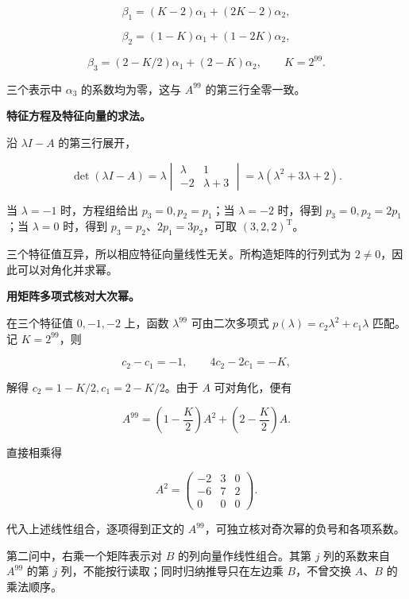 \documentclass[UTF8,11pt,fontset=windows]{ctexart}
\begin{document}
$$
\beta_1=(K-2)\alpha_1+(2K-2)\alpha_2,
$$

$$
\beta_2=(1-K)\alpha_1+(1-2K)\alpha_2,
$$

$$
\beta_3=(2-K/2)\alpha_1+(2-K)\alpha_2,
\qquad K=2^{99}.
$$

三个表示中 $\alpha_3$ 的系数均为零，这与 $A^{99}$ 的第三行全零一致。

\textbf{特征方程及特征向量的求法。}

沿 $\lambda I-A$ 的第三行展开，

$$
\det(\lambda I-A)
=\lambda\begin{vmatrix}\lambda&1\\-2&\lambda+3\end{vmatrix}
=\lambda(\lambda^2+3\lambda+2).
$$

当 $\lambda=-1$ 时，方程组给出 $p_3=0,p_2=p_1$；当 $\lambda=-2$ 时，得到 $p_3=0,p_2=2p_1$；当 $\lambda=0$ 时，得到 $p_3=p_2$、$2p_1=3p_2$，可取 $(3,2,2)^{\mathrm T}$。

三个特征值互异，所以相应特征向量线性无关。所构造矩阵的行列式为 $2\ne0$，因此可以对角化并求幂。

\textbf{用矩阵多项式核对大次幂。}

在三个特征值 $0,-1,-2$ 上，函数 $\lambda^{99}$ 可由二次多项式 $p(\lambda)=c_2\lambda^2+c_1\lambda$ 匹配。记 $K=2^{99}$，则

$$
c_2-c_1=-1,\qquad4c_2-2c_1=-K,
$$

解得 $c_2=1-K/2,c_1=2-K/2$。由于 $A$ 可对角化，便有

$$
A^{99}=\left(1-\frac K2\right)A^2+\left(2-\frac K2\right)A.
$$

直接相乘得

$$
A^2=\begin{pmatrix}-2&3&0\\-6&7&2\\0&0&0\end{pmatrix}.
$$

代入上述线性组合，逐项得到正文的 $A^{99}$，可独立核对奇次幂的负号和各项系数。

第二问中，右乘一个矩阵表示对 $B$ 的列向量作线性组合。其第 $j$ 列的系数来自 $A^{99}$ 的第 $j$ 列，不能按行读取；同时归纳推导只在左边乘 $B$，不曾交换 $A$、$B$ 的乘法顺序。
\end{document}
